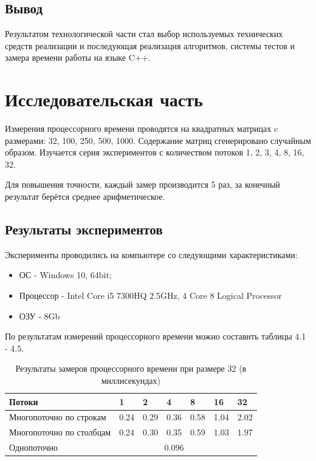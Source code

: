 \documentclass[12pt,a4paper]{report}
\begin{document}
\section{Вывод}

Результатом технологической части стал выбор используемых технических средств 
реализации и последующая реализация алгоритмов, системы тестов и замера 
времени работы на языке C++.

\chapter{Исследовательская часть} 

Измерения процессорного времени проводятся на квадратных матрицах c размерами: 
32, 100, 250, 500, 1000. Содержание матриц сгенерировано случайным образом.
Изучается серия экспериментов с количеством потоков 1, 2, 3, 4, 8, 16, 32.

Для повышения точности, каждый замер производится 5 раз, за конечный результат 
берётся среднее арифметическое.

\section{Результаты экспериментов}

Эксперименты проводились на компьютере со следующими характеристиками:
\begin{itemize}
    \item ОС - Windows 10, 64bit;
    \item Процессор - Intel Core i5 7300HQ 2.5GHz, 4 Core 8 Logical Processor
    \item ОЗУ - 8Gb
\end{itemize}

По результатам измерений процессорного времени можно составить таблицы 4.1 - 4.5.

\begin{table}[h!]
\caption{Результаты замеров процессорного времени при размере 32 (в миллисекундах)}
\label{tabular:timesandtenses}
\begin{center}
\begin{tabular}{ | l | l | l | l | l | l | l | }
\hline
        Потоки                   & 1    & 2    & 4    & 8    & 16   & 32   \\ \hline
        Многопоточно по строкам  & 0.24 & 0.29 & 0.36 & 0.58 & 1.04 & 2.02 \\ \hline
        Многопоточно по столбцам & 0.24 & 0.30 & 0.35 & 0.59 & 1.03 & 1.97 \\ \hline
        Однопоточно              &      \multicolumn{5}{c}{0.096}   &      \\ \hline
\end{tabular}
\end{center}
\end{table}
\end{document}
